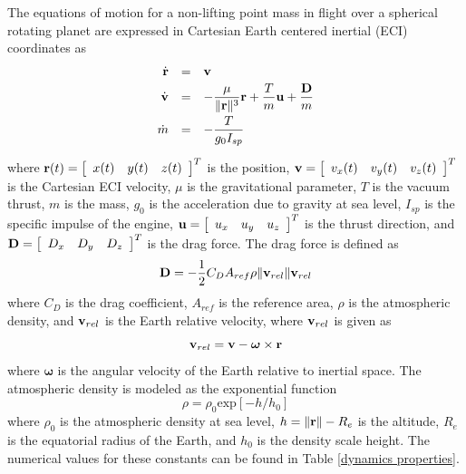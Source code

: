 \documentclass[10pt]{article}
\begin{document}
The equations of motion for a non-lifting point mass in flight over a
spherical rotating planet are expressed in Cartesian Earth centered inertial
(ECI) coordinates as
\begin{equation}\label{dyncs}
\begin{array}{rcl}
  \dot{\textbf{r}} &=& {\bf v} \vspace{3pt}\\
  \dot{\textbf{v}} &=& -\displaystyle\frac{\mu}{\|\textbf{r}\|^3}{\bf r} +
  \displaystyle\frac{T}{m}{\bf u} + \displaystyle\frac{{\bf D}}{m}  \vspace{3pt}\\
  \dot{m} & = & -\displaystyle\frac{T}{g_0I_{sp}}
\vspace{3pt}\\
\end{array}
\end{equation}
where ${\bf r}(t)=\left[\begin{array}{ccc} x(t) & y(t) & z(t)\end{array}\right]^T$
is the position, ${\bf v} = \left[\begin{array}{ccc} v_x(t) & v_y(t) & v_z(t)\end{array}\right]^T$
is the Cartesian ECI velocity, $\mu$ is the gravitational parameter, $T$ is
the vacuum thrust, $m$ is the mass, $g_0$ is the acceleration due to gravity at sea level,
$I_{sp}$ is the specific impulse of the engine,
${\bf u} = \left[\begin{array}{ccc} u_x & u_y & u_z \end{array}\right]^T$ is the thrust
direction, and ${\bf D}=\left[\begin{array}{ccc} D_x & D_y & D_z \end{array}\right]^T$
is the drag force.  The drag force is defined as
\begin{equation}
  {\bf D} = -\frac{1}{2}C_D A_{ref}\rho \|{\bf v}_{rel}\|{\bf v}_{rel}
\end{equation}
where $C_D$ is the drag coefficient, $A_{ref}$ is the reference area, $\rho$
is the atmospheric density, and ${\bf v}_{rel}$ is the Earth relative
velocity, where ${\bf v}_{rel}$ is given as
\begin{equation}
{\bf v}_{rel} = {\bf v}-\boldsymbol{\omega} \times {\bf r}
\end{equation}
where $\boldsymbol\omega$ is the angular velocity of the Earth relative to
inertial space.  The atmospheric density is modeled as the exponential
function
\begin{equation}
\rho = \rho_0\mbox{exp}[-h/h_0]
\end{equation}
where $\rho_0$ is the atmospheric density at sea level, $h=\|\mathbf{r}\|-R_e$ is
the altitude, $R_e$ is the equatorial radius of the Earth, and $h_0$ is the
density scale height.  The numerical values for these constants can be found
in Table \ref{dynamics properties}.
\end{document}
